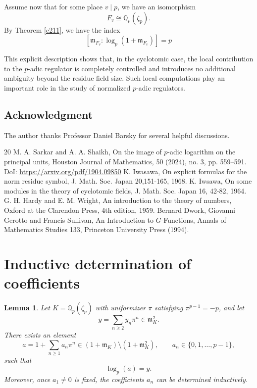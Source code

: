 \documentclass[12pt,reqno]{amsart}
\numberwithin{figure}{section}
\theoremstyle{plain}
\newtheorem{lem}[thm]{Lemma}
\theoremstyle{definition}
\numberwithin{equation}{section}
\begin{document}
Assume now that for some place $v \mid p$, we have an isomorphism 
\[F_v \cong \mathbb{Q}_p(\zeta_p).\]
By Theorem \ref{c211}, we have the index
\[[\mathfrak{m}_{F_v}: \log_p(1+\mathfrak{m}_{F_v})]=p\]

This explicit description shows that, in the cyclotomic case, the local contribution to the $p$-adic regulator is completely controlled and introduces no additional ambiguity beyond the residue field size. Such local computations play an important
role in the study of normalized $p$-adic regulators.


\subsection*{Acknowledgment} The author thanks Professor Daniel Barsky for several helpful discussions.
	         
  \begin{thebibliography}{20}
	 M. A. Sarkar and A. A. Shaikh, On the image of $p$-adic logarithm on the principal units, Houston Journal of Mathematics, 50 (2024), no. 3, pp. 559–591. DoI: \url{https://arxiv.org/pdf/1904.09850}
     K. Iwasawa, On explicit formulas for the norm residue symbol, J. Math. Soc. Japan 20,151-165, 1968.
     K. Iwsawa, On some modules in the theory of cyclotomic fields, J. Math. Soc. Japan 16, 42-82, 1964.
     G. H. Hardy and E. M. Wright, An introduction to the theory of numbers, Oxford at the Clarendon Press, 4th edition, 1959.
     Bernard Dwork, Giovanni Gerotto and Francis Sullivan, An Introduction to $G$-Functions, Annals of Mathematics Studies 133, Princeton University Press (1994).
\end{thebibliography}  

\appendix
\section{Inductive determination of coefficients}
\begin{lem} \label{A1}
Let $K=\mathbb{Q}_p(\zeta_p)$ with uniformizer $\pi$ satisfying $\pi^{p-1}=-p$, and let
\[
y=\sum_{n\ge 2} y_n \pi^n \in \mathfrak m_K^2 .
\]
There exists an element
\[
a=1+\sum_{n\ge 1} a_n \pi^n \in (1+\mathfrak m_K)\setminus(1+\mathfrak m_K^2),
\qquad a_n\in\{0,1,\dots,p-1\},
\]
such that
\[
\log_p(a)=y .
\]
Moreover, once $a_1\neq 0$ is fixed, the coefficients $a_n$ can be determined inductively.
\end{lem}
\end{document}
